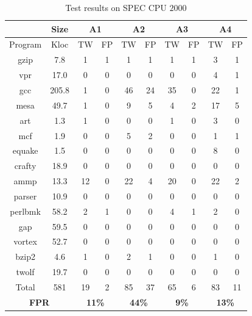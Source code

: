 \begin{table}[!h]
\center
\caption{Test results on SPEC CPU $2000$}\label{tab:4}
\hspace{-0.5cm}\begin{tabular}{|c|c|c|c|c|c|c|c|c|c|}
\hline
& \textbf{Size} & \multicolumn{2}{|c|}{\textbf{A1}} & \multicolumn{2}{|c|}{\textbf{A2}} & \multicolumn{2}{|c|}{\textbf{A3}} & \multicolumn{2}{|c|}{\textbf{A4}}\\
\hline
Program & Kloc & TW & FP & TW & FP & TW & FP & TW & FP\\
\hline
gzip       & 7.8    & 1  & 1 & 1	& 1   & 1   & 1  & 3  & 1\\
\hline
vpr        & 17.0   & 0  & 0 & 0	 & 0   & 0  &	0  &	4   &1\\
\hline
gcc        & 205.8 & 1  & 0 & 46 & 24 & 35 &	0  & 22 & 1\\
\hline
mesa     & 49.7   & 1  & 0 & 9	 & 5	   & 4  & 2  & 17 & 5\\
\hline
art         & 1.3     & 1  & 0 &0   & 0	   & 1  &	0   & 3  & 0\\
\hline
mcf        & 1.9     & 0  & 0 & 5  &  2  & 0   & 0  & 1  & 1\\
\hline
equake   & 1.5     & 0  & 0 & 0	 & 0   &	0  & 0   & 8  & 0\\
\hline
crafty     & 18.9   & 0	 & 0	 & 0	 & 0	  & 0   & 0   & 0   & 0\\
\hline
ammp    & 13.3   & 12 & 0 & 22 & 4  & 	20 & 0  & 22 & 2\\
\hline
parser    & 10.9   & 0	 & 0	 & 0	   &0  & 0    & 0  & 0  & 0\\
\hline
perlbmk & 58.2   & 2   & 1	 & 0	   & 0  &	4   & 1  & 2  & 0\\
\hline
gap        & 59.5   &  0 & 0 & 0    & 	0  &	0   & 0   & 0	& 0\\
\hline
vortex    & 52.7    & 0	 & 0	 & 0	   & 0  &	0   & 0   & 0	& 0\\
\hline 
bzip2     & 4.6      & 1 & 0	 & 2	   & 1  &	0   & 0   & 1	& 0\\
\hline
twolf     & 19.7     & 0 & 0	 & 0	   & 0  &	0   & 0   & 0	& 0\\
\hline
Total     & 581      & 19 & 2 & 85 &	37 & 65 & 6	& 83 & 11\\
\hline
\multicolumn{2}{|c|}{\textbf{FPR}} & \multicolumn{2}{|c|}{\textbf{11\%}} & \multicolumn{2}{|c|}{\textbf{44\%}} & \multicolumn{2}{|c|}{\textbf{9\%}}  &\multicolumn{2}{|c|}{\textbf{13\%}}\\
\hline
\end{tabular}
\end{table}


